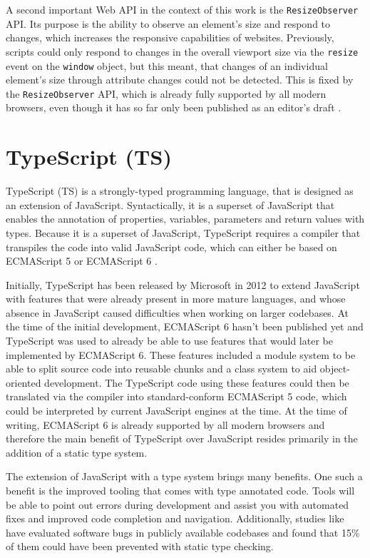 A second important Web API in the context of this work is the \lstinline{ResizeObserver} API. Its purpose is the ability to observe an element's size and respond to changes, which increases the responsive capabilities of websites. Previously, scripts could only respond to changes in the overall viewport size via the \lstinline{resize} event on the \lstinline{window} object, but this meant, that changes of an individual element's size through attribute changes could not be detected. This is fixed by the \lstinline{ResizeObserver} API, which is already fully supported by all modern browsers, even though it has so far only been published as an editor's draft \parencite{ResizeObserver}.

\section{TypeScript (TS)}

TypeScript (TS) is a strongly-typed programming language, that is designed as an extension of JavaScript. Syntactically, it is a superset of JavaScript that enables the annotation of properties, variables, parameters and return values with types. Because it is a superset of JavaScript, TypeScript requires a compiler that transpiles the code into valid JavaScript code, which can either be based on ECMAScript 5 \parencite{ECMAScript5} or ECMAScript 6 \parencite{ECMAScript6}.

Initially, TypeScript has been released by Microsoft in 2012 \parencite{TSFirstRelease} to extend JavaScript with features that were already present in more mature languages, and whose absence in JavaScript caused difficulties when working on larger codebases. At the time of the initial development, ECMAScript 6 hasn't been published yet and TypeScript was used to already be able to use features that would later be implemented by ECMAScript 6. These features included a module system to be able to split source code into reusable chunks and a class system to aid object-oriented development. The TypeScript code using these features could then be translated via the compiler into standard-conform ECMAScript 5 code, which could be interpreted by current JavaScript engines at the time. At the time of writing, ECMAScript 6 is already supported by all modern browsers and therefore the main benefit of TypeScript over JavaScript resides primarily in the addition of a static type system.

The extension of JavaScript with a type system brings many benefits. One such a benefit is the improved tooling that comes with type annotated code. Tools will be able to point out errors during development and assist you with automated fixes and improved code completion and navigation. Additionally, studies like \cite{ToTypeOrNotToType} have evaluated software bugs in publicly available codebases and found that 15\% of them could have been prevented with static type checking.

